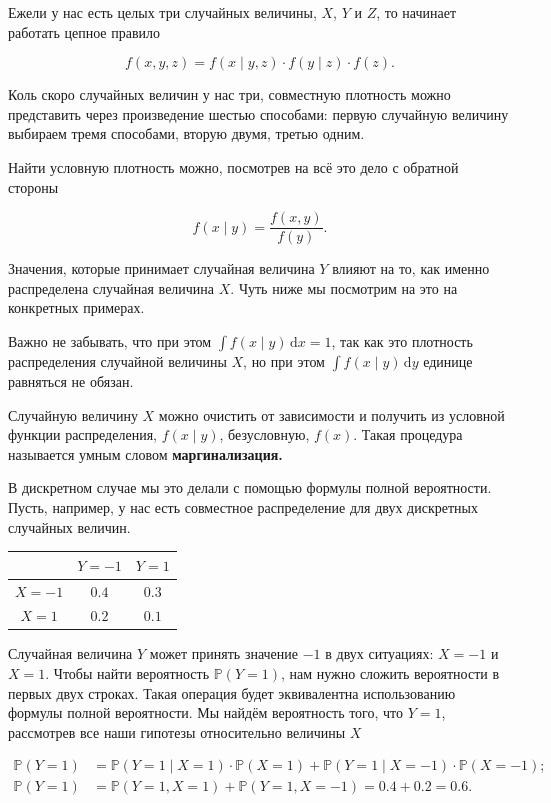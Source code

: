 \documentclass[12pt, a4paper, oneside]{extreport}
\def \mbb{\mathbb}
\def \PP{\mbb{P}}
\newcommand{\dx}[1]{\,\mathrm{d}#1} %
\newcommand{\indef}[1]{\textbf{#1}}     %
\theoremstyle{plain}              %
\theoremstyle{definition}         %
\begin{document}
Ежели у нас есть целых три случайных величины, $X$, $Y$ и $Z$, то начинает работать цепное правило

\[ f(x,y,z) = f(x \mid y,z) \cdot f(y \mid z) \cdot f(z).\]

Коль скоро случайных величин у нас три, совместную плотность можно представить через произведение шестью способами: первую случайную величину выбираем тремя способами, вторую двумя, третью одним.

Найти условную плотность можно, посмотрев на всё это дело с обратной стороны

\begin{equation}\label{f2}
f(x \mid y)  =  \frac{f(x,y)}{f(y)}.
\end{equation}

Значения, которые принимает случайная величина $Y$ влияют на то, как именно распределена случайная величина $X$. Чуть ниже мы посмотрим на это на конкретных примерах. 

Важно не забывать, что при этом $\int f(x \mid y) \dx{x} = 1$, так как это плотность распределения случайной величины $X$, но при этом $\int f(x \mid y) \dx{y}$ единице равняться не обязан.

Случайную величину $X$ можно очистить от зависимости  и получить из условной функции распределения, $f(x \mid y)$, безусловную, $f(x)$.  Такая процедура называется умным словом \indef{маргинализация.}

В дискретном случае мы это делали с помощью формулы полной вероятности. Пусть, например, у нас есть совместное распределение для двух дискретных случайных величин.

\begin{center}
\begin{tabular}{c|c|c}
       &  $Y = -1$    &  $Y = 1$   \\ \hline
$X = -1$   & $0.4$    &  $0.3$ \\ \hline
$X = 1$    & $0.2$    &  $0.1$ \\
\end{tabular}
\end{center}

Случайная величина $Y$ может принять значение $-1$ в двух ситуациях: $X=-1$ и $X=1$. Чтобы найти вероятность $\PP(Y=1)$, нам нужно сложить вероятности в первых двух строках. Такая операция будет эквивалентна использованию формулы полной вероятности. Мы найдём вероятность того, что $Y=1$, рассмотрев все наши гипотезы относительно величины $X$


\begin{equation*}
\begin{aligned}
 \PP(Y=1) &= \PP(Y=1 \mid X=1) \cdot \PP(X=1) + \PP(Y=1 \mid X = -1) \cdot \PP(X = -1);\\
  \PP(Y=1) &=   \PP(Y=1, X=1) + \PP(Y=1,X=-1) = 0.4 + 0.2 = 0.6.
  \end{aligned}
 \end{equation*}
\end{document}
